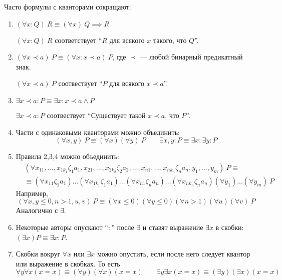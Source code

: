 Часто формулы с кванторами сокращают:
\begin{enumerate}
  \item{}$(\forall x:Q)~R\equiv (\forall x)~Q\implies R$

  $(\forall x:Q)~R$ соответствует ``$R$ для всякого $x$ такого, что $Q$''.

  \item{}$(\forall x\prec a)~P\equiv (\forall x:x\prec a)~P$,
  где $\prec$ --- любой бинарный предикатный знак.

  ${(\forall x\prec a)~P}$ соотвествует
  ``$P$ для всякого $x\prec a$''.

  \item{}$\exists x\prec a:P\equiv\exists x:x\prec a\land P$

  $\exists x\prec a:P$ соотвествует
  ``Существует такой $x\prec a$, что $P$''.

  \item{}Части с одинаковыми кванторами можно объединить:
  \[
    (\forall x,y)~P\equiv(\forall x)(\forall y)~P\qquad
    \exists x,y:P\equiv\exists x:\exists y:P
  \]

  \item{}Правила 2,3,4 можно объединить:
  \[
    \begin{aligned}
       & (\forall x_{11},...,x_{1k_1}\zeta_1a_1,x_{21},...,x_{2k_2}\zeta_2a_2,...,
      x_{n1},...,x_{nk_n}\zeta_na_n,y_1,...,y_{m})~P\equiv                         \\
       & \equiv (\forall x_{11}\zeta_{1}a_1)...(\forall x_{1k_1}\zeta_1a_1)...
      (\forall x_{n1}\zeta_{n}a_{n})...(\forall x_{nk_{n}}\zeta_{n}a_{n})
      (\forall y_1)...(\forall y_{m})~P
    \end{aligned}
  \]
  Например,
  \[
    (\forall x,y\leq 0,n>1,u,v)~P\equiv (\forall x\leq 0)(\forall y\leq 0)
    (\forall n>1)(\forall u)(\forall v)~P
  \]
  Аналогично с $\exists$.

  \item{}Некоторые авторы опускают ``$:$'' после $\exists$ и
  ставят выражение $\exists x$ в скобки:
  $(\exists x)P\equiv \exists x:P$.

  \item{}Скобки вокруг $\forall x$ или $\exists x$ можно опустить,
  если после него следует квантор или выражение в скобках.
  То есть
  \[
    \forall y\forall x (x=x)\equiv (\forall y)(\forall x)(x=x)\qquad
    \exists y\exists x(x=x)\equiv (\exists y)(\exists x)(x=x)
  \]
\end{enumerate}

